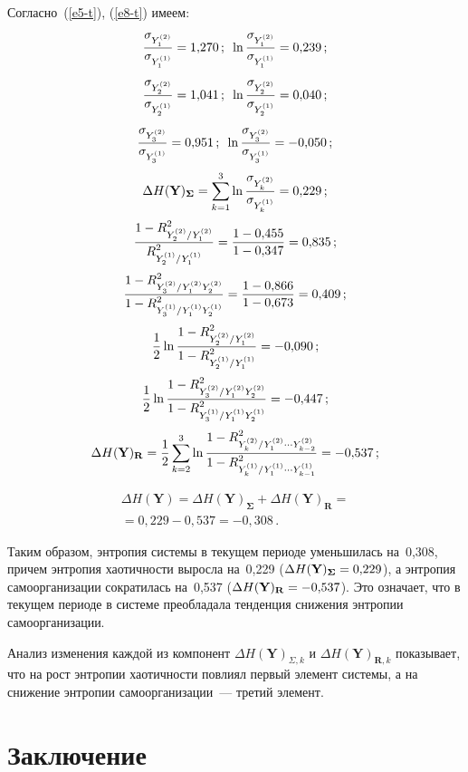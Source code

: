 \begin{multicols}{2}
  Согласно~(\ref{e5-t}), (\ref{e8-t}) имеем:
  $$
  \displaystyle\frac{\displaystyle \sigma_{Y_1^{(2)}}\mathstrut}{\displaystyle \sigma_{Y_1^{(1)}}\mathstrut} =1{,}270\,;\enskip 
  \ln \displaystyle\frac{\displaystyle \sigma_{Y_1^{(2)}}\mathstrut}{\displaystyle \sigma_{Y_1^{(1)}}\mathstrut}=0{,}239\,;
  $$
  $$
    \displaystyle\frac{\displaystyle \sigma_{Y_2^{(2)}}\mathstrut}{\displaystyle \sigma_{Y_2^{(1)}}\mathstrut} =1{,}041\,; \enskip
  \ln \displaystyle\frac{\displaystyle \sigma_{Y_2^{(2)}}\mathstrut}{\displaystyle \sigma_{Y_2^{(1)}}\mathstrut}=0{,}040\,;
  $$
  $$
    \displaystyle\frac{\displaystyle \sigma_{Y_3^{(2)}}\mathstrut}{\displaystyle \sigma_{Y_3^{(1)}}\mathstrut} =0{,}951\,;\enskip
  \ln \displaystyle\frac{\displaystyle \sigma_{Y_3^{(2)}}\mathstrut}{\displaystyle \sigma_{Y_3^{(1)}}\mathstrut}=-0{,}050\,;
  $$
  $$
  \Delta H(\mathbf{Y})_{\boldsymbol{\Sigma}} =\sum\limits_{k=1}^3 \ln 
\displaystyle\frac{\displaystyle \sigma_{Y_k^{(2)}}\mathstrut}{\displaystyle \sigma_{Y_k^{(1)}}\mathstrut} =0{,}229\,;
  $$
  $$
  \displaystyle\frac{\displaystyle 1-R^2_{Y_2^{(2)}/Y_1^{(2)}}\mathstrut}{\displaystyle R^2_{Y_2^{(1)}/Y_1^{(1)}}\mathstrut} =\displaystyle\frac{\displaystyle 1-
0{,}455\mathstrut}{\displaystyle 1-0{,}347\mathstrut}=0{,}835\,;
  $$
  $$
  \displaystyle\frac{\displaystyle 1-R^2_{Y_3^{(2)}/Y_1^{(2)}Y_2^{(2)}}\mathstrut}{\displaystyle 1-R^2_{Y_3^{(1)}/Y_1^{(1)}Y_2^{(1)}}\mathstrut} 
=\displaystyle\frac{\displaystyle 1-0{,}866\mathstrut}{\displaystyle 1-0{,}673\mathstrut}=0{,}409\,;
  $$
  $$
  \displaystyle\frac{\displaystyle 1\mathstrut}{\displaystyle 2\mathstrut}\ln \displaystyle\frac{\displaystyle 1-R^2_{Y_2^{(2)}/Y_1^{(2)}}\mathstrut}{\displaystyle 1-
R^2_{Y_2^{(1)}/Y_1^{(1)}}\mathstrut} =-0{,}090\,;
  $$
  $$
  \displaystyle\frac{\displaystyle 1\mathstrut}{\displaystyle 2\mathstrut}\ln \displaystyle\frac{\displaystyle 1-R^2_{Y_3^{(2)}/Y_1^{(2)}Y_2^{(2)}}\mathstrut}{\displaystyle 1-R^2_{Y_3^{(1)}/Y_1^{(1)}Y_2^{(1)}}\mathstrut} =-0{,}447\,;
  $$
  $$
  \Delta H(\mathbf{Y})_{\mathbf{R}} =\displaystyle\frac{\displaystyle 1\mathstrut}{\displaystyle 2\mathstrut}\sum\limits_{k=2}^3 \ln 
  \displaystyle\frac{\displaystyle 1-R^2_{Y_k^{(2)}/Y_1^{(2)}\cdots 
  Y_{k-2}^{(2)}}\mathstrut}{\displaystyle 1-R^2_{Y_k^{(1)}/Y_1^{(1)}\cdots Y_{k-1}^{(1)}}\mathstrut} =
  -0{,}537\,;
  $$
 
 \vspace*{-12pt}
 
 \noindent
 \begin{multline*}
  \Delta H(\mathbf{Y}) =  \Delta H(\mathbf{Y})_{\boldsymbol{\Sigma}} +\Delta 
H(\mathbf{Y})_{\mathbf{R}} ={}\\
{}=0{,}229-0{,}537=-0{,}308\,.
  \end{multline*}
  
  Таким образом, энтропия системы в текущем периоде уменьшилась на~0,308, 
причем энтропия хаотичности выросла на~0,229 ($\Delta 
H(\mathbf{Y})_{\boldsymbol{\Sigma}}\hm=0{,}229$), а энтропия самоорганизации 
сократилась на~0,537 ($\Delta H(\mathbf{Y})_{\mathbf{R}}\hm= -0{,}537$). 
Это означает, что в текущем периоде в системе преобладала тенденция 
снижения энтропии самоорганизации.
  
  Анализ изменения каждой из компонент $\Delta H(\mathbf{Y})_{\Sigma,k}$ и 
$\Delta H(\mathbf{Y})_{\mathbf{R},k}$ показывает, что на рост энтропии 
хаотичности повлиял первый элемент сис\-те\-мы, а на снижение энтропии 
самоорганизации~--- третий элемент.
  
  \section{Заключение}
  

\end{multicols}
